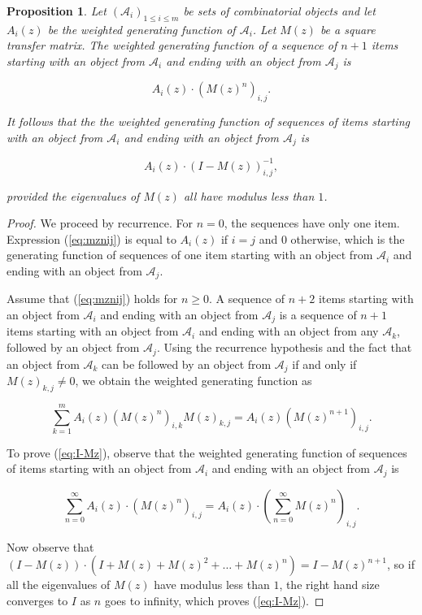 \documentclass{article}
\newtheorem{proposition}{Proposition}
\begin{document}
\begin{proposition}
\label{th:transfermatrices}
Let $(\mathcal{A}_i)_{1 \leq i \leq m}$ be sets of combinatorial objects
and let $A_i(z)$ be the weighted generating function of $\mathcal{A}_i$.
Let $M(z)$ be a square transfer matrix. The weighted generating function
of a sequence of $n+1$ items starting with an object from $\mathcal{A}_i$
and ending with an object from $\mathcal{A}_j$ is

\begin{equation}
\label{eq:mznij}
A_i(z) \cdot \left( M(z)^n \right)_{i,j}.
\end{equation}

It follows that the the weighted generating function of sequences of items
starting with an object from $\mathcal{A}_i$ and ending with an object
from $\mathcal{A}_j$ is

\begin{equation}
\label{eq:I-Mz}
A_i(z) \cdot \left( I - M(z) \right)^{-1}_{i,j},
\end{equation}

\noindent
provided the eigenvalues of $M(z)$ all have modulus less than $1$.
\end{proposition}

\begin{proof}
We proceed by recurrence. For $n = 0$, the sequences have only one item.
Expression (\ref{eq:mznij}) is equal to $A_i(z)$ if $i = j$ and $0$
otherwise, which is the generating function of sequences of one item
starting with an object from $\mathcal{A}_i$ and ending with an object
from $\mathcal{A}_j$.

Assume that (\ref{eq:mznij}) holds for $n \geq 0$. A sequence of $n+2$
items starting with an object from $\mathcal{A}_i$ and ending with an
object from $\mathcal{A}_j$ is a sequence of $n+1$ items starting with an
object from $\mathcal{A}_i$ and ending with an object from any
$\mathcal{A}_k$, followed by an object from $\mathcal{A}_j$. Using the
recurrence hypothesis and the fact that an object from $\mathcal{A}_k$ can
be followed by an object from $\mathcal{A}_j$ if and only if $M(z)_{k,j}
\neq 0$, we obtain the weighted generating function as

\begin{equation*}
\sum_{k = 1}^m A_i(z)\left( M(z)^n \right)_{i,k} M(z)_{k,j} 
 = A_i(z) \left( M(z)^{n+1} \right)_{i,j}.
\end{equation*}

To prove (\ref{eq:I-Mz}), observe that the weighted generating function of
sequences of items starting with an object from $\mathcal{A}_i$ and ending
with an object from $\mathcal{A}_j$ is

\begin{equation*}
\sum_{n=0}^\infty A_i(z) \cdot \left(M(z)^n \right)_{i,j} =
 A_i(z) \cdot \left( \sum_{n=0}^\infty M(z)^n\right)_{i,j} .
\end{equation*}

Now observe that $(I-M(z)) \cdot (I+M(z)+M(z)^2+ \ldots + M(z)^n) =
I-M(z)^{n+1}$, so if all the eigenvalues of $M(z)$ have modulus less than
$1$, the right hand size converges to $I$ as $n$ goes to infinity, which
proves (\ref{eq:I-Mz}).
\end{proof}
\end{document}
